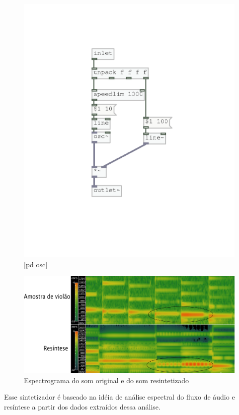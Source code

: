 \documentclass{ppgmus}
\begin{document}
\begin{figure}[!ht]
\includegraphics[scale=.7]{osc-base}
\caption{[pd osc]}
\label{pdosc}
\end{figure}

\begin{figure}[!ht]
\includegraphics[scale=.7]{spectro}
\caption{Espectrograma do som original e do som resintetizado}
\label{spectro}
\end{figure}


Esse sintetizador é baseado na idéia de análise espectral do fluxo
de áudio e resíntese a partir dos dados extraídos dessa análise.
\end{document}
